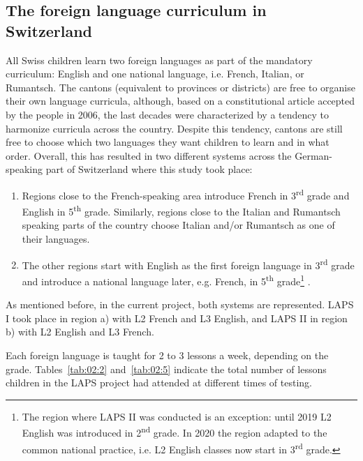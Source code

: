 \documentclass[output=paper]{langsci/langscibook}
\begin{document}
 \subsection{The foreign language curriculum in Switzerland}


All Swiss children learn two foreign languages as part of the mandatory curriculum: English and one national language, i.e. French, Italian, or Rumantsch. The cantons (equivalent to provinces or districts) are free to organise their own language curricula, although, based on a constitutional article accepted by the people in 2006, the last decades were characterized by a tendency to harmonize curricula across the country. Despite this tendency, cantons are still free to choose which two languages they want children to learn and in what order. Overall, this has resulted in two different systems across the German-speaking part of Switzerland where this study took place:

\begin{enumerate}[label=\alph*.]
\item Regions close to the French-speaking area introduce French in 3\textsuperscript{rd} grade and English in 5\textsuperscript{th} grade. Similarly, regions close to the Italian and Rumantsch speaking parts of the country choose Italian and/or Rumantsch as one of their languages.
\item The other regions start with English as the first foreign language in 3\textsuperscript{rd} grade and introduce a national language later, e.g. French, in 5\textsuperscript{th} grade\footnote{The region where LAPS II was conducted is an exception: until 2019 L2 English was introduced in 2\textsuperscript{nd} grade. In 2020 the region adapted to the common national practice, i.e. L2 English classes now start in 3\textsuperscript{rd} grade.} .
\end{enumerate}

As mentioned before, in the current project, both systems are represented. LAPS I took place in region a) with L2 French and L3 English, and LAPS II in region b) with L2 English and L3 French.

Each foreign language is taught for 2 to 3 lessons a week, depending on the grade. Tables~\ref{tab:02:2} and~\ref{tab:02:5} indicate the total number of lessons children in the LAPS project had attended at different times of testing. 
\end{document}
